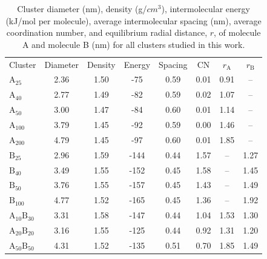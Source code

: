 \begin{table}[ht]
\centering
\caption{Cluster diameter (nm), density (g/$cm^3$), intermolecular energy (kJ/mol per molecule), average intermolecular spacing (nm), average coordination number, and equilibrium radial distance, $r$, of molecule A and molecule B (nm) for all clusters studied in this work.} %
\label{table:maintable}
\begin{tabular}{lccccccc}
\hline
\multicolumn{1}{l}{\multirow{2}{*}{Cluster}} & \multicolumn{1}{c}{\multirow{2}{*}{Diameter}} & \multicolumn{1}{c}{\multirow{2}{*}{Density}} & \multicolumn{1}{c}{\multirow{2}{*}{Energy}} & \multicolumn{1}{c}{\multirow{2}{*}{Spacing}} &
\multicolumn{1}{c}{\multirow{2}{*}{CN}} &\multicolumn{1}{c}{\multirow{2}{*}{$r_{\text{A}}$}} & 
\multicolumn{1}{c}{\multirow{2}{*}{$r_{\text{B}}$}} \\ 
\multicolumn{1}{c}{} & \multicolumn{1}{c}{} & \multicolumn{1}{c}{} & \multicolumn{1}{c}{} & \multicolumn{1}{c}{} & \multicolumn{1}{c}{} & \multicolumn{1}{c}{} \\ \hline
$\text{A}_{\text{25}}$ & 2.36 & 1.50 & -75 & 0.59 & 0.01 &  0.91 & -- \\
$\text{A}_{\text{40}}$ & 2.77 & 1.49 & -82 & 0.59 & 0.02 & 1.07 & -- \\
$\text{A}_{\text{50}}$ & 3.00 & 1.47 & -84 & 0.60 & 0.01 & 1.14 & -- \\
$\text{A}_{\text{100}}$ & 3.79 & 1.45 & -92 & 0.59 & 0.00 & 1.46 & -- \\
$\text{A}_{\text{200}}$ & 4.79 & 1.45 & -97 & 0.60 & 0.01 & 1.85 & -- \\ \hline
$\text{B}_{\text{25}}$ & 2.96 & 1.59 & -144 & 0.44 & 1.57 & -- & 1.27 \\
$\text{B}_{\text{40}}$ & 3.49 & 1.55 & -152 & 0.45 & 1.58 & -- & 1.45 \\
$\text{B}_{\text{50}}$ & 3.76 & 1.55 & -157 & 0.45 & 1.43 & -- & 1.49 \\
$\text{B}_{\text{100}}$ & 4.77 & 1.52 & -165 & 0.45 & 1.36 & -- & 1.92 \\ \hline
$\text{A}_{\text{10}}\text{B}_{\text{30}}$ & 3.31 & 1.58 & -147 & 0.44 & 1.04 & 1.53 & 1.30 \\ 
$\text{A}_{\text{20}}\text{B}_{\text{20}}$ & 3.16 & 1.55 & -125 & 0.44 & 0.92 & 1.31 & 1.20 \\
$\text{A}_{\text{50}}\text{B}_{\text{50}}$ & 4.31 & 1.52 & -135 & 0.51 & 0.70 & 1.85 & 1.49 \\ 

\end{tabular}
\end{table}
